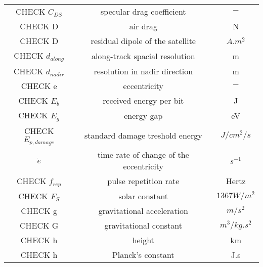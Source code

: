 \documentclass[11pt]{report}
\begin{document}
\begin{center}
\begin{longtable}{c|c|c}
CHECK $C_{DS}$						       								& specular drag coefficient 						& $-$ \\

CHECK D																		& air drag 																		& N \\

CHECK D                                 & residual dipole of the satellite               & $A.m^2$ \\

CHECK $d_{along}$                        & along-track spacial resolution                              & m \\

CHECK $d_{nadir}$                             & resolution in nadir direction                 & m \\

CHECK e 																	& eccentricity 																& $-$ \\

CHECK $E_b$                                  & received energy per bit                  & J \\

CHECK $E_g$                                & energy gap                                 & eV \\

CHECK $E_{p,damage}$                        & standard damage treshold energy            & $J/cm^2/s$ \\

$\dot e$ 														& time rate of change of the eccentricity			& $s^{-1}$ \\

CHECK $f_{rep}$                      & pulse repetition rate                   & Hertz \\

CHECK $F_S$                           & solar constant                            & $1367 W/m^2$ \\

CHECK g 																	& gravitational acceleration 									& $m/s^2$ \\

CHECK G                                   & gravitational constant                      & $m^3/{kg.s^2}$ \\

CHECK h                                   & height                                      & km \\

CHECK h                                   & Planck's constant                           & J.s \\


\end{longtable}
\end{center}
\end{document}
